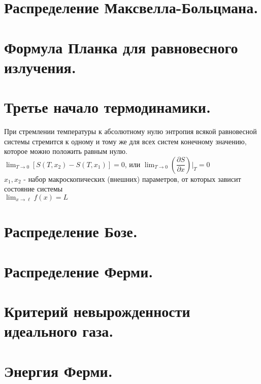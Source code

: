 \begin{multicols*}{2}
		\section{Распределение Максвелла-Больцмана.}

		\section{Формула Планка для равновесного излучения.}

		\section{Третье начало термодинамики.}
		При стремлении температуры к абсолютному  нулю энтропия всякой равновесной системы стремится к одному и тому же для всех систем конечному значению, которое можно положить равным нулю.\\
		$\lim_{T\to 0} [ S(T, x_2) - S(T, x_1)] =0$, или $\lim_{T\to 0} (\dfrac{\partial S}{\partial x})\vert _T = 0$\\
		$x_1, x_2$ - набор макроскопических (внешних) параметров, от которых зависит состояние системы\\
		$\lim _{x \to \ell }f(x)=L$

		\section{Распределение Бозе.}

		\section{Распределение Ферми.}

		\section{Критерий невырожденности идеального газа.}

		\section{Энергия Ферми.}

	\end{multicols*}

